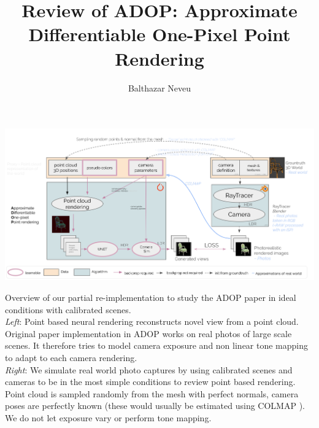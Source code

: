 \documentclass[sigconf, nonacm]{acmart}
\title{Review of ADOP: Approximate Differentiable One-Pixel Point Rendering}
\author{Balthazar Neveu}
\affiliation{%
  \institution{ENS Paris-Saclay}
  \city{Saclay}
  \country{France}
}
\begin{document}

  \begin{teaserfigure}
    \includegraphics[width=1.\textwidth]{figures/teaser_figure.png}
    \centering
    \caption{Overview of our partial re-implementation to study the ADOP \cite{ruckert2022adop} paper in ideal conditions with calibrated scenes. \\
      \textit{Left}: Point based neural rendering reconstructs novel view from a point cloud. Original paper implementation in ADOP  works on real photos of large scale scenes. It therefore tries to model camera exposure and non linear tone mapping to adapt to each camera rendering. \\
      \textit{Right}: We simulate real world photo captures by using calibrated scenes and cameras to be in the most simple conditions to review point based rendering. Point cloud is sampled randomly from the mesh with perfect normals, camera poses are perfectly known (these would usually be estimated using COLMAP \cite{schoenberger2016sfm}). We do not let exposure vary or perform tone mapping.
    }
    \label{fig:original_pipeline}
  \end{teaserfigure}

  \maketitle




  
  
  
  
  

  \newpage

  \appendix
  
  
  \newpage
  
  
\end{document}
